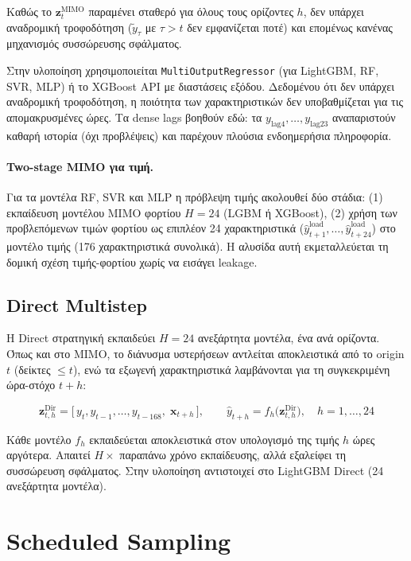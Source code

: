 Καθώς το $\mathbf{z}^{\mathrm{MIMO}}_{t}$ παραμένει σταθερό για όλους τους ορίζοντες
$h$, δεν υπάρχει αναδρομική τροφοδότηση ($\tilde{y}_\tau$ με $\tau > t$ δεν εμφανίζεται
ποτέ) και επομένως κανένας μηχανισμός συσσώρευσης σφάλματος.

Στην υλοποίηση χρησιμοποιείται \texttt{MultiOutputRegressor} (για LightGBM, RF, SVR,
MLP) ή το XGBoost API με διαστάσεις εξόδου. Δεδομένου ότι δεν υπάρχει αναδρομική
τροφοδότηση, η ποιότητα των χαρακτηριστικών δεν υποβαθμίζεται για τις απομακρυσμένες
ώρες. Τα dense lags βοηθούν εδώ: τα $y_{\text{lag4}}, \ldots, y_{\text{lag23}}$
αναπαριστούν καθαρή ιστορία (όχι προβλέψεις) και παρέχουν πλούσια ενδοημερήσια
πληροφορία.

\paragraph{Two-stage MIMO για τιμή.} Για τα μοντέλα RF, SVR και MLP η πρόβλεψη τιμής
ακολουθεί δύο στάδια: (1) εκπαίδευση μοντέλου MIMO φορτίου $H=24$ (LGBM ή XGBoost),
(2) χρήση των προβλεπόμενων τιμών φορτίου ως επιπλέον 24 χαρακτηριστικά
($\hat{y}^{\text{load}}_{t+1}, \ldots, \hat{y}^{\text{load}}_{t+24}$) στο μοντέλο τιμής
(176 χαρακτηριστικά συνολικά). Η αλυσίδα αυτή εκμεταλλεύεται τη δομική σχέση
τιμής-φορτίου χωρίς να εισάγει leakage.


\subsection{Direct Multistep}

Η Direct στρατηγική εκπαιδεύει $H = 24$ ανεξάρτητα μοντέλα, ένα ανά ορίζοντα. Όπως και
στο MIMO, το διάνυσμα υστερήσεων αντλείται αποκλειστικά από το origin $t$ (δείκτες
$\le t$), ενώ τα εξωγενή χαρακτηριστικά λαμβάνονται για τη συγκεκριμένη ώρα-στόχο
$t+h$:

\begin{equation}
  \mathbf{z}^{\mathrm{Dir}}_{t,h} = \big[\,y_{t}, y_{t-1}, \ldots, y_{t-168},\;
  \mathbf{x}_{t+h}\,\big], \qquad
  \hat{y}_{t+h} = f_h\!\big(\mathbf{z}^{\mathrm{Dir}}_{t,h}\big),
  \quad h = 1, \ldots, 24
  \label{eq:direct_methods}
\end{equation}

Κάθε μοντέλο $f_h$ εκπαιδεύεται αποκλειστικά στον υπολογισμό της τιμής $h$ ώρες αργότερα.
Απαιτεί $H\times$ παραπάνω χρόνο εκπαίδευσης, αλλά εξαλείφει τη συσσώρευση
σφάλματος. Στην υλοποίηση αντιστοιχεί στο LightGBM Direct (24 ανεξάρτητα μοντέλα).


\section{Scheduled Sampling}
\label{sec:scheduled_sampling_methods}

